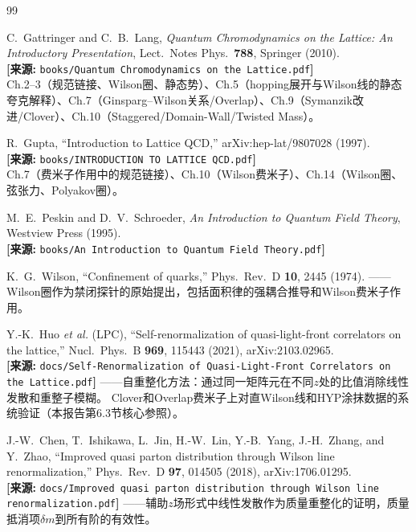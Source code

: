 \documentclass[12pt,a4paper]{ctexart}
\theoremstyle{definition}
\begin{document}
\begin{thebibliography}{99}

C.~Gattringer and C.~B.~Lang,
\textit{Quantum Chromodynamics on the Lattice: An Introductory Presentation},
Lect.\ Notes Phys.\ \textbf{788}, Springer (2010).
\\\textbf{[来源:} \texttt{books/Quantum Chromodynamics on the Lattice.pdf}\textbf{]}
\\Ch.2--3（规范链接、Wilson圈、静态势）、Ch.5（hopping展开与Wilson线的静态夸克解释）、Ch.7（Ginsparg--Wilson关系/Overlap）、Ch.9（Symanzik改进/Clover）、Ch.10（Staggered/Domain-Wall/Twisted Mass）。

R.~Gupta,
``Introduction to Lattice QCD,''
arXiv:hep-lat/9807028 (1997).
\\\textbf{[来源:} \texttt{books/INTRODUCTION TO LATTICE QCD.pdf}\textbf{]}
\\Ch.7（费米子作用中的规范链接）、Ch.10（Wilson费米子）、Ch.14（Wilson圈、弦张力、Polyakov圈）。

M.~E.~Peskin and D.~V.~Schroeder,
\textit{An Introduction to Quantum Field Theory},
Westview Press (1995).
\\\textbf{[来源:} \texttt{books/An Introduction to Quantum Field Theory.pdf}\textbf{]}

K.~G.~Wilson,
``Confinement of quarks,''
Phys.\ Rev.\ D \textbf{10}, 2445 (1974).
——Wilson圈作为禁闭探针的原始提出，包括面积律的强耦合推导和Wilson费米子作用。

Y.-K.~Huo \textit{et al.} (LPC),
``Self-renormalization of quasi-light-front correlators on the lattice,''
Nucl.\ Phys.\ B \textbf{969}, 115443 (2021), arXiv:2103.02965.
\\\textbf{[来源:} \texttt{docs/Self-Renormalization of Quasi-Light-Front Correlators on the Lattice.pdf}\textbf{]}
——自重整化方法：通过同一矩阵元在不同$z$处的比值消除线性发散和重整子模糊。
Clover和Overlap费米子上对直Wilson线和HYP涂抹数据的系统验证（本报告第6.3节核心参照）。

J.-W.~Chen, T.~Ishikawa, L.~Jin, H.-W.~Lin, Y.-B.~Yang, J.-H.~Zhang, and Y.~Zhao,
``Improved quasi parton distribution through Wilson line renormalization,''
Phys.\ Rev.\ D \textbf{97}, 014505 (2018), arXiv:1706.01295.
\\\textbf{[来源:} \texttt{docs/Improved quasi parton distribution through Wilson line renormalization.pdf}\textbf{]}
——辅助$z$场形式中线性发散作为质量重整化的证明，质量抵消项$\delta m$到所有阶的有效性。


\end{thebibliography}
\end{document}
